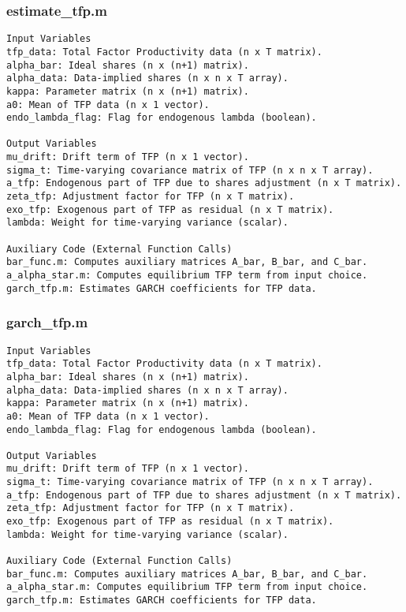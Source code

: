 \documentclass[11pt]{article}
\theoremstyle{definition}
\newcommand{\codepath}{F:/12004835/replication_package_final/replication_package_final}
\begin{document}
	
	
	\subsubsection{estimate\_tfp.m}
	\begin{lstlisting}[style=Matlab]
Input Variables
tfp_data: Total Factor Productivity data (n x T matrix).
alpha_bar: Ideal shares (n x (n+1) matrix).
alpha_data: Data-implied shares (n x n x T array).
kappa: Parameter matrix (n x (n+1) matrix).
a0: Mean of TFP data (n x 1 vector).
endo_lambda_flag: Flag for endogenous lambda (boolean).

Output Variables
mu_drift: Drift term of TFP (n x 1 vector).
sigma_t: Time-varying covariance matrix of TFP (n x n x T array).
a_tfp: Endogenous part of TFP due to shares adjustment (n x T matrix).
zeta_tfp: Adjustment factor for TFP (n x T matrix).
exo_tfp: Exogenous part of TFP as residual (n x T matrix).
lambda: Weight for time-varying variance (scalar).

Auxiliary Code (External Function Calls)
bar_func.m: Computes auxiliary matrices A_bar, B_bar, and C_bar.
a_alpha_star.m: Computes equilibrium TFP term from input choice.
garch_tfp.m: Estimates GARCH coefficients for TFP data.
	\end{lstlisting}
	
	
	
	
	\subsubsection{garch\_tfp.m}
	\begin{lstlisting}[style=Matlab]
Input Variables
tfp_data: Total Factor Productivity data (n x T matrix).
alpha_bar: Ideal shares (n x (n+1) matrix).
alpha_data: Data-implied shares (n x n x T array).
kappa: Parameter matrix (n x (n+1) matrix).
a0: Mean of TFP data (n x 1 vector).
endo_lambda_flag: Flag for endogenous lambda (boolean).

Output Variables
mu_drift: Drift term of TFP (n x 1 vector).
sigma_t: Time-varying covariance matrix of TFP (n x n x T array).
a_tfp: Endogenous part of TFP due to shares adjustment (n x T matrix).
zeta_tfp: Adjustment factor for TFP (n x T matrix).
exo_tfp: Exogenous part of TFP as residual (n x T matrix).
lambda: Weight for time-varying variance (scalar).

Auxiliary Code (External Function Calls)
bar_func.m: Computes auxiliary matrices A_bar, B_bar, and C_bar.
a_alpha_star.m: Computes equilibrium TFP term from input choice.
garch_tfp.m: Estimates GARCH coefficients for TFP data.
	\end{lstlisting}
	
	
\end{document}
